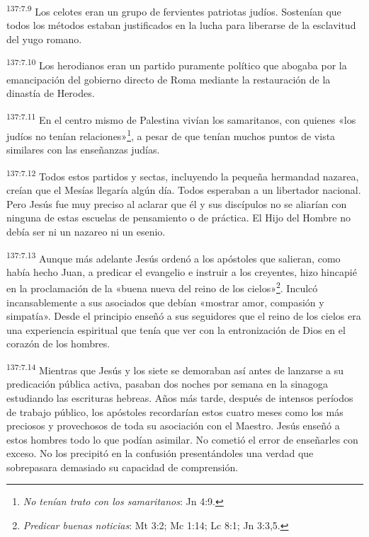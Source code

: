 \par
\textsuperscript{137:7.9} Los celotes eran un grupo de fervientes patriotas judíos. Sostenían que todos los métodos estaban justificados en la lucha para liberarse de la esclavitud del yugo romano.

\par
\textsuperscript{137:7.10} Los herodianos eran un partido puramente político que abogaba por la emancipación del gobierno directo de Roma mediante la restauración de la dinastía de Herodes.

\par
\textsuperscript{137:7.11} En el centro mismo de Palestina vivían los samaritanos, con quienes «los judíos no tenían relaciones»\footnote{\textit{No tenían trato con los samaritanos}: Jn 4:9.}, a pesar de que tenían muchos puntos de vista similares con las enseñanzas judías.

\par
\textsuperscript{137:7.12} Todos estos partidos y sectas, incluyendo la pequeña hermandad nazarea, creían que el Mesías llegaría algún día. Todos esperaban a un libertador nacional. Pero Jesús fue muy preciso al aclarar que él y sus discípulos no se aliarían con ninguna de estas escuelas de pensamiento o de práctica. El Hijo del Hombre no debía ser ni un nazareo ni un esenio.

\par
\textsuperscript{137:7.13} Aunque más adelante Jesús ordenó a los apóstoles que salieran, como había hecho Juan, a predicar el evangelio e instruir a los creyentes, hizo hincapié en la proclamación de la «buena nueva del reino de los cielos»\footnote{\textit{Predicar buenas noticias}: Mt 3:2; Mc 1:14; Lc 8:1; Jn 3:3,5.}. Inculcó incansablemente a sus asociados que debían «mostrar amor, compasión y simpatía». Desde el principio enseñó a sus seguidores que el reino de los cielos era una experiencia espiritual que tenía que ver con la entronización de Dios en el corazón de los hombres.

\par
\textsuperscript{137:7.14} Mientras que Jesús y los siete se demoraban así antes de lanzarse a su predicación pública activa, pasaban dos noches por semana en la sinagoga estudiando las escrituras hebreas. Años más tarde, después de intensos períodos de trabajo público, los apóstoles recordarían estos cuatro meses como los más preciosos y provechosos de toda su asociación con el Maestro. Jesús enseñó a estos hombres todo lo que podían asimilar. No cometió el error de enseñarles con exceso. No los precipitó en la confusión presentándoles una verdad que sobrepasara demasiado su capacidad de comprensión.

